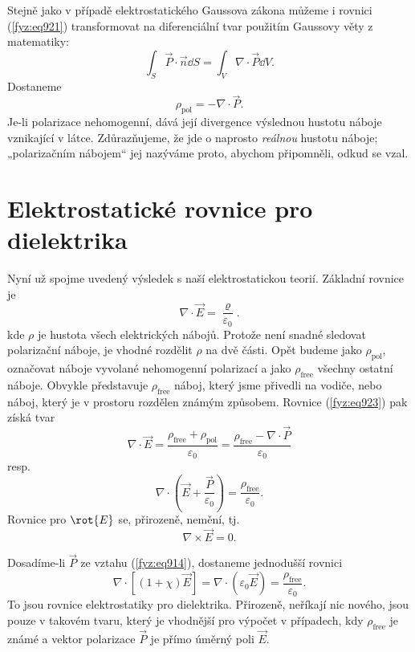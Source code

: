     Stejně jako v případě elektrostatického Gaussova zákona můžeme i rovnici (\ref{fyz:eq921})
    transformovat na diferenciální tvar použitím Gaussovy věty z matematiky:
    \begin{equation*}
      \int_S\vec{P}\cdot\vec{n}\dd{S}=\int_V∇\cdot\vec{P}\dd{V}.
    \end{equation*}
    Dostaneme
    \begin{equation}\label{fyz:eq922}
      ρ_{\text{pol}}=−∇⋅\vec{P}.
    \end{equation}
    Je-li polarizace nehomogenní, dává její divergence výslednou hustotu náboje vznikající v látce.
    Zdůrazňujeme, že jde o naprosto \emph{reálnou} hustotu náboje; „polarizačním nábojem“ jej
    nazýváme proto, abychom připomněli, odkud se vzal.

  \section{Elektrostatické rovnice pro dielektrika}\label{fyz:IIchapXsecIV}
    Nyní už spojme uvedený výsledek s naší elektrostatickou teorií. Základní rovnice je
    \begin{equation}\label{fyz:eq923}
      ∇\cdot\vec{E}=\dfrac{\varrho}{\varepsilon_0}.
    \end{equation}
    kde \(ρ\) je hustota všech elektrických nábojů. Protože není snadné sledovat polarizační náboje,
    je vhodné rozdělit \(ρ\) na dvě části. Opět budeme jako \(ρ_{\text{pol}}\), označovat náboje
    vyvolané nehomogenní polarizací a jako \(ρ_{\text{free}}\) všechny ostatní náboje. Obvykle
    představuje \(ρ_{\text{free}}\) náboj, který jsme přivedli na vodiče, nebo náboj, který je v
    prostoru rozdělen známým způsobem. Rovnice (\ref{fyz:eq923}) pak získá tvar
    \begin{equation*}
      ∇⋅\vec{E}=\dfrac{ρ_{\text{free}}+ρ_{\text{pol}}}{\varepsilon_0}
               =\dfrac{ρ_{\text{free}}−∇⋅\vec{P}}{\varepsilon_0}
    \end{equation*}
    resp. 
    \begin{equation}\label{fyz:eq923}
      ∇\cdot\left(\vec{E}+\dfrac{\vec{P}}{\varepsilon_0}\right)
        =\dfrac{ρ_{\text{free}}}{\varepsilon_0}.
    \end{equation}
    Rovnice pro \(\rot{E}\) se, přirozeně, nemění, tj.
    \begin{equation}\label{fyz:eq924}
      ∇×\vec{E}=0.
    \end{equation}

    Dosadíme-li \(\vec{P}\) ze vztahu (\ref{fyz:eq914}), dostaneme jednodušší rovnici
    \begin{equation}\label{fyz:eq925}
      ∇\cdot[(1+χ)\vec{E}]=∇⋅(\varepsilon_0\vec{E})=\dfrac{ρ_{\text{free}}}{\varepsilon_0}.
    \end{equation}
    To jsou rovnice elektrostatiky pro dielektrika. Přirozeně, neříkají nic nového, jsou pouze v
    takovém tvaru, který je vhodnější pro výpočet v případech, kdy \(ρ_{\text{free}}\) je známé a
    vektor polarizace \(\vec{P}\) je přímo úměrný poli \(\vec{E}\).


